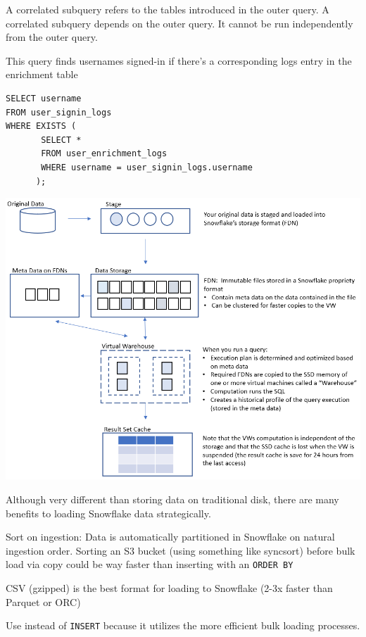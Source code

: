 \documentclass[9pt]{innovativeinnovation-cheatsheet}
\begin{document}
\begin{multicols}{3}
A correlated subquery refers to the tables introduced in the outer query. A correlated subquery depends on the outer query. It cannot be run independently from the outer query.

This query finds usernames signed-in if there's a corresponding logs entry in the enrichment table
\vspace{-8pt}
\begin{lstlisting}[style=code_style]
SELECT username 
FROM user_signin_logs
WHERE EXISTS (
       SELECT *
       FROM user_enrichment_logs
       WHERE username = user_signin_logs.username
      );
\end{lstlisting}

\includegraphics[width=\linewidth]{snowflake_basics.png}

Although very different than storing data on traditional disk, there are many benefits to loading Snowflake data strategically.
\be{}
      \item Sort on ingestion: Data is automatically partitioned in Snowflake on natural ingestion order. Sorting an S3 bucket (using something like syncsort) before bulk load via copy could be way faster than inserting with an \texttt{ORDER BY}
      \item CSV (gzipped) is the best format for loading to Snowflake (2-3x faster than Parquet or ORC)
      \item Use  instead of \texttt{INSERT} because it utilizes the more efficient bulk loading processes.
\ee{}


\end{multicols}
\end{document}
